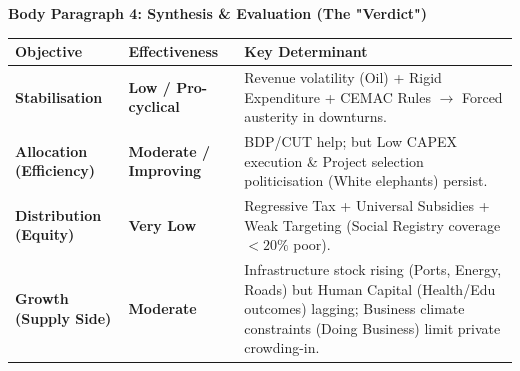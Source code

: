 \documentclass[11pt]{article}
\begin{document}
\begin{exoresolu}
\textbf{Body Paragraph 4: Synthesis \& Evaluation (The "Verdict")} 
\begin{center}
\begin{tabularx}{\linewidth}{|l|X|X|}
\hline
\rowcolor{popblueL} \textbf{Objective} & \textbf{Effectiveness} & \textbf{Key Determinant} \\
\hline
\textbf{Stabilisation} & \textbf{Low / Pro-cyclical} & Revenue volatility (Oil) + Rigid Expenditure + CEMAC Rules $\rightarrow$ Forced austerity in downturns. \\
\hline
\textbf{Allocation (Efficiency)} & \textbf{Moderate / Improving} & BDP/CUT help; but Low CAPEX execution \& Project selection politicisation (White elephants) persist. \\
\hline
\textbf{Distribution (Equity)} & \textbf{Very Low} & Regressive Tax + Universal Subsidies + Weak Targeting (Social Registry coverage $< 20\%$ poor). \\
\hline
\textbf{Growth (Supply Side)} & \textbf{Moderate} & Infrastructure stock rising (Ports, Energy, Roads) but Human Capital (Health/Edu outcomes) lagging; Business climate constraints (Doing Business) limit private crowding-in. \\
\hline
\end{tabularx}
\end{center}


\end{exoresolu}
\end{document}
